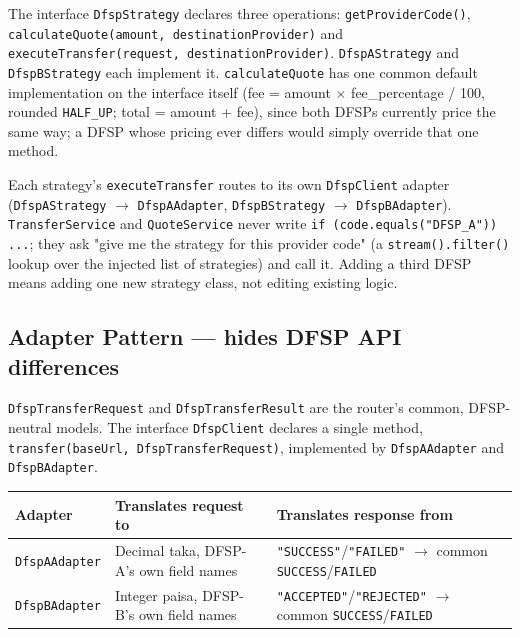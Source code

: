 \documentclass[12pt,a4paper]{article}
\begin{document}
The interface \texttt{DfspStrategy} declares three operations: \texttt{getProviderCode()},
\texttt{calculateQuote(\allowbreak{}amount,\allowbreak{} destinationProvider)} and
\texttt{executeTransfer(\allowbreak{}request,\allowbreak{} destinationProvider)}. \texttt{DfspAStrategy} and
\texttt{DfspBStrategy} each implement it. \texttt{calculateQuote} has one common
default implementation on the interface itself (fee = amount $\times$
fee\_percentage / 100, rounded \texttt{HALF\_UP}; total = amount + fee), since both
DFSPs currently price the same way; a DFSP whose pricing ever differs would simply
override that one method.

Each strategy's \texttt{executeTransfer} routes to its own \texttt{DfspClient}
adapter (\texttt{DfspAStrategy} $\rightarrow$ \texttt{DfspAAdapter},
\texttt{DfspBStrategy} $\rightarrow$ \texttt{DfspBAdapter}). \texttt{TransferService}
and \texttt{QuoteService} never write \texttt{if\allowbreak{} (code.equals(\allowbreak{}"DFSP\_A"))\allowbreak{} ...}; they
ask "give me the strategy for this provider code" (a
\texttt{stream().filter()} lookup over the injected list of strategies) and call it.
Adding a third DFSP means adding one new strategy class, not editing existing logic.

\subsection{Adapter Pattern --- hides DFSP API differences}

\texttt{DfspTransferRequest} and \texttt{DfspTransferResult} are the router's common,
DFSP-neutral models. The interface \texttt{DfspClient} declares a single method,
\texttt{transfer(baseUrl, DfspTransferRequest)}, implemented by \texttt{DfspAAdapter}
and \texttt{DfspBAdapter}.

\begin{longtable}{L{0.22\textwidth} L{0.34\textwidth} L{0.34\textwidth}}
\toprule
\textbf{Adapter} & \textbf{Translates request to} & \textbf{Translates response
from} \\
\midrule
\endhead
\texttt{DfspAAdapter} & Decimal taka, DFSP-A's own field names &
\texttt{"SUCCESS"}/\texttt{"FAILED"} $\rightarrow$ common \texttt{SUCCESS}/\texttt{FAILED} \\
\texttt{DfspBAdapter} & Integer paisa, DFSP-B's own field names &
\texttt{"ACCEPTED"}/\texttt{"REJECTED"} $\rightarrow$ common \texttt{SUCCESS}/\texttt{FAILED} \\
\bottomrule
\end{longtable}
\end{document}
